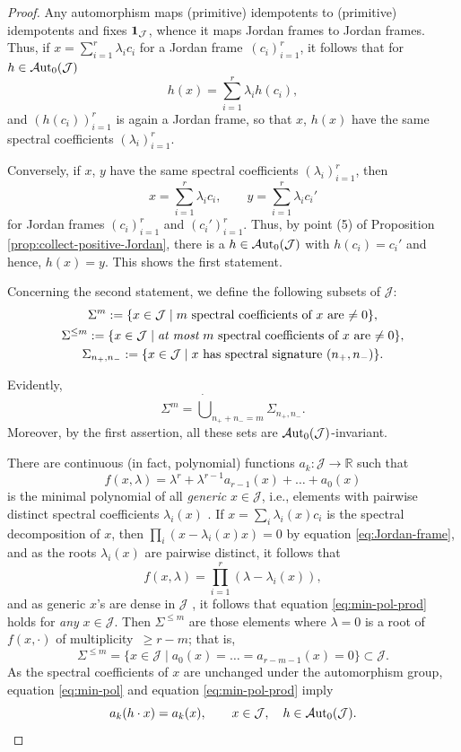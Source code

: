 \documentclass[pdftex]{sigma}
\numberwithin{equation}{section}
\newcommand{\be}{\begin{equation}}
\newcommand{\ee}{\end{equation}}
\newcommand{\Aut}{\mathcal{A}{\rm ut}}
\newcommand{\Jcal}{\mathcal{J}}
\newcommand{\R}{{\mathbb R}}
\begin{document}
\begin{proof}
Any automorphism maps (primitive) idempotents to (primitive) idempotents and fixes ${\bf 1}_\Jcal$, whence it maps Jordan frames to Jordan frames. Thus, if $x = \sum_{i=1}^r \lambda_i c_i$ for a Jordan frame~$(c_i)_{i=1}^r$, it follows that for $h \in \Aut_0(\Jcal)$
\[
h(x) = \sum_{i=1}^r \lambda_i h(c_i),
\]
and $(h(c_i))_{i=1}^r$ is again a Jordan frame, so that $x$, $h(x)$ have the same spectral coefficients $(\lambda_i)_{i=1}^r$.

Conversely, if $x$, $y$ have the same spectral coefficients $(\lambda_i)_{i=1}^r$, then
\[
x = \sum_{i=1}^r \lambda_i c_i, \qquad y = \sum_{i=1}^r \lambda_i c_i'
\]
for Jordan frames $(c_i)_{i=1}^r$ and $(c_i')_{i=1}^r$. Thus, by point (5) of Proposition \ref{prop:collect-positive-Jordan}, there is a $h \in \Aut_0(\Jcal)$ with $h(c_i) = c_i'$ and hence, $h(x) = y$. This shows the first statement.

Concerning the second statement, we define the following subsets of $\Jcal$:
\begin{gather*}
\Sigma^m := \{x \in \Jcal \mid \text{$m$ spectral coefficients of $x$ are $\neq 0$}\},\\
\Sigma^{\leq m} := \{x \in \Jcal \mid \text{{\em at most} $m$ spectral coefficients of $x$ are $\neq 0$}\},\\
\Sigma_{n_+, n_-} := \{x \in \Jcal \mid \text{$x$ has spectral signature $(n_+, n_-)$}\}.
\end{gather*}

Evidently,
\be \label{eq:decomp-Sigma_m}
\Sigma^m = \dot \bigcup_{n_++n_- = m} \Sigma_{n_+,n_-}.
\ee
Moreover, by the first assertion, all these sets are $\Aut_0(\Jcal)$-invariant.

There are continuous (in fact, polynomial) functions $a_k\colon \Jcal \to \R$ such that
\be \label{eq:min-pol}
f(x, \lambda) = \lambda^r + \lambda^{r-1} a_{r-1}(x) + \dots + a_0(x)
\ee
is the minimal polynomial of all {\em generic }$x \in \Jcal$, i.e., elements with pairwise distinct spectral coefficients $\lambda_i(x)$ \cite[Proposition II.2.1]{F-K-1994}.
If $x = \sum_i \lambda_i(x) c_i$ is the spectral decomposition of $x$, then $\prod_i(x - \lambda_i(x) x) = 0$ by equation \eqref{eq:Jordan-frame}, and as the roots $\lambda_i(x)$ are pairwise distinct, it follows that
\be \label{eq:min-pol-prod}
f(x, \lambda) = \prod_{i=1}^r (\lambda - \lambda_i(x)),
\ee
and as generic $x$'s are dense in $\Jcal$ \cite[Proposition II.2.1]{F-K-1994}, it follows that equation \eqref{eq:min-pol-prod} holds for {\em any }$x \in \Jcal$. Then $\Sigma^{\leq m}$ are those elements where $\lambda = 0$ is a root of $f(x, \cdot)$ of multiplicity~$\geq r-m$; that is,
\be \label{Sigma-minimal}
\Sigma^{\leq m} = \{x \in \Jcal \mid a_0(x) = \dots = a_{r-m-1}(x) = 0\} \subset \Jcal.
\ee
As the spectral coefficients of $x$ are unchanged under the automorphism group, equation \eqref{eq:min-pol} and equation \eqref{eq:min-pol-prod} imply
\be \label{eq:a_k-invariant}
a_k(h \cdot x) = a_k(x), \qquad x \in \Jcal, \quad h \in \Aut_0(\Jcal).
\ee


\end{proof}
\end{document}
